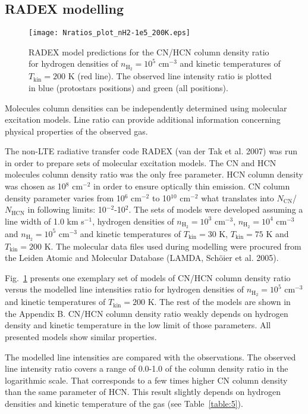 \documentclass{aa}
\begin{document}
\subsection{RADEX modelling}

\begin{figure}
   \centering
   \texttt{[image: Nratios\_plot\_nH2-1e5\_200K.eps]}
      \caption{RADEX model predictions for the CN/HCN column density ratio for hydrogen densities of $n_\mathrm{H_2} = 10^5$ cm$^{-3}$ and kinetic temperatures of $T_\mathrm{kin} = 200$ K (red line). The observed line intensity ratio is plotted in blue (protostars positions) and green (all positions).}
         \label{1e5_75K}
   \end{figure}

Molecules column densities can be independently determined using molecular excitation models. Line ratio can provide additional information concerning physical properties of the observed gas. 

The non-LTE radiative transfer code RADEX (van der Tak et al. 2007) was run in order to prepare sets of molecular excitation models. The CN and HCN molecules column density ratio was the only free parameter. HCN column density was chosen as 10$^8$ cm$^{-2}$ in order to ensure optically thin emission. CN column density parameter varies from 10$^6$ cm$^{-2}$ to 10$^{10}$ cm$^{-2}$ what translates into $N_\mathrm{CN}$/$N_\mathrm{HCN}$ in following limits: 10$^{-2}$-10$^{2}$. The sets of models were developed assuming a line width of 1.0 km s$^{-1}$, hydrogen densities of $n_\mathrm{H_2} = 10^3$ cm$^{-3}$, $n_\mathrm{H_2} = 10^4$ cm$^{-3}$ and $n_\mathrm{H_2} = 10^5$ cm$^{-3}$ and kinetic temperatures of $T_\mathrm{kin} = 30$ K, $T_\mathrm{kin} = 75$ K and $T_\mathrm{kin} =200$ K. The molecular data files used during modelling were procured from the Leiden Atomic and Molecular Database (LAMDA, Schöier et al. 2005).

Fig.~\ref{1e5_75K} presents one exemplary set of models of CN/HCN column density ratio versus the modelled line intensities ratio for hydrogen densities of $n_\mathrm{H_2} = 10^5$ cm$^{-3}$ and kinetic temperatures of $T_\mathrm{kin} = 200$ K. The rest of the models are shown in the Appendix B. CN/HCN column density ratio weakly depends on hydrogen density and kinetic temperature in the low limit of those parameters. All presented models show similar properties.

The modelled line intensities are compared with the observations. The observed line intensity ratio covers a range of \mbox{0.0-1.0} of the column density ratio in the logarithmic scale. That corresponds to a few times higher CN column density than the same parameter of HCN. This result slightly depends on hydrogen densities and kinetic temperature of the gas (see Table~\ref{table:5}).
\end{document}
